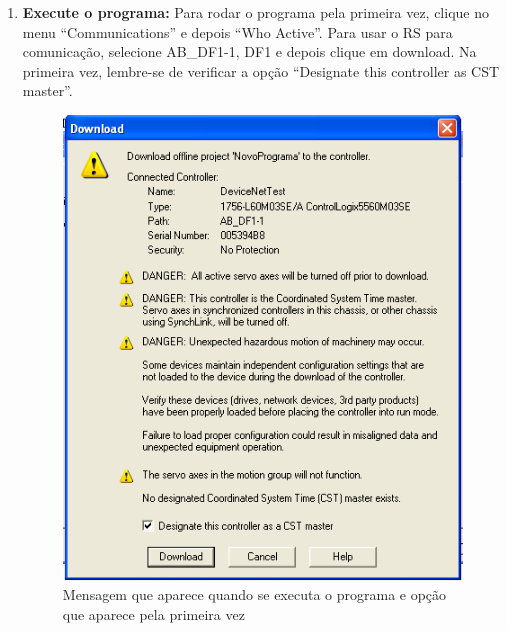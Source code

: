 \documentclass[a4paper,11pt]{scrartcl} %
\numberwithin{equation}{section} %
\numberwithin{figure}{section} %
\numberwithin{table}{section} %
\begin{document}
\begin{enumerate}
     \item \textbf{Execute o programa: } Para rodar o programa pela primeira vez, clique no menu ``Communications'' e depois ``Who Active''. Para usar o RS para comunicação, selecione AB\_DF1-1, DF1 e depois clique em download. Na primeira vez, lembre-se de verificar a opção ``Designate this controller as CST master''.
	
	\begin{figure}[H]
       \centering
              \includegraphics[width=0.9\linewidth]{figures/software/step23}
              \caption{Mensagem que aparece quando se executa o programa e opção que aparece pela primeira vez\label{mensagemRodar}}
          \end{figure}
\end{enumerate}
\end{document}
